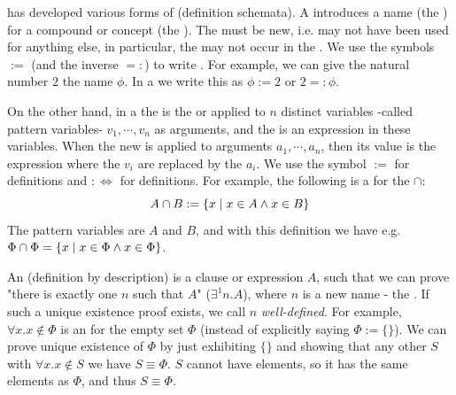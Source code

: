  has developed various forms of  (definition schemata). A  introduces a name (the ) for a compound  or concept (the ). The  must be new, i.e. may not have been used for anything else, in particular, the  may not occur in the . We use the symbols $:=$ (and the inverse $=:$) to write . For example, we can give the natural number $2$ the name $\phi$. In a  we write this as $\phi := 2$ or $2 =: \phi$.

On the other hand, in a  the  is the  or  applied to $n$ distinct variables -called pattern variables- $v_1, \cdots, v_n$ as arguments, and the  is an expression in these variables. When the new  is applied to arguments $a_1, \cdots, a_n$, then its value is the  expression where the $v_i$ are replaced by the $a_i$. We use the symbol $:=$ for  definitions and $:\Leftrightarrow$ for  definitions. For example, the following is a  for the  $\cap$:
\[
A \cap B := \left\{x \mid x \in A \land x \in B\right\}
\] 
The pattern variables are $A$ and $B$, and with this definition we have e.g. $\Phi \cap \Phi = \left\{x \mid x \in \Phi \land x \in \Phi\right\}$.

An  (definition by description) is a clause or expression $A$, such that we can prove "there is exactly one $n$ such that $A$" ($\exists^1 n.A$), where $n$ is a new name - the . If such a unique existence proof exists, we call $n$ \textit{well-defined}. For example, $\forall x.x \notin \Phi$ is an  for the empty set $\Phi$ (instead of explicitly saying $\Phi := \{ \}$). We can prove unique existence of $\Phi$ by just exhibiting $\{ \}$ and showing that any other  $S$ with $\forall x.x \notin S$ we have $S \equiv \Phi$. $S$ cannot have elements, so it has the same elements as $\Phi$, and thus $S \equiv \Phi$.

